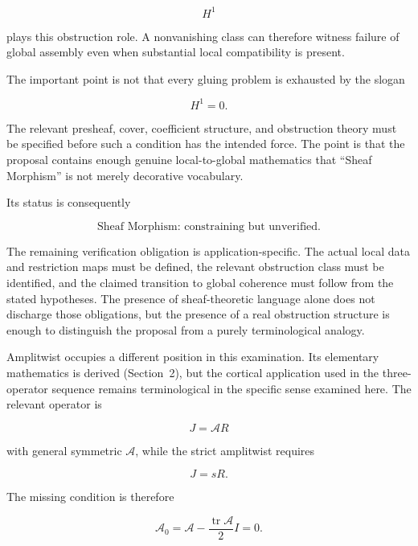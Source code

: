 \documentclass[11pt]{article}
\begin{document}
\begin{equation}
H^1
\end{equation}

plays this obstruction role. A nonvanishing class can therefore witness failure of global assembly even when substantial local compatibility is present.

The important point is not that every gluing problem is exhausted by the slogan

\begin{equation}
H^1=0.
\end{equation}

The relevant presheaf, cover, coefficient structure, and obstruction theory must be specified before such a condition has the intended force. The point is that the proposal contains enough genuine local-to-global mathematics that ``Sheaf Morphism'' is not merely decorative vocabulary.

Its status is consequently

\begin{equation}
\boxed{
\text{Sheaf Morphism: constraining but unverified}.
}
\end{equation}

The remaining verification obligation is application-specific. The actual local data and restriction maps must be defined, the relevant obstruction class must be identified, and the claimed transition to global coherence must follow from the stated hypotheses. The presence of sheaf-theoretic language alone does not discharge those obligations, but the presence of a real obstruction structure is enough to distinguish the proposal from a purely terminological analogy.

Amplitwist occupies a different position in this examination. Its elementary mathematics is derived (Section~2), but the cortical application used in the three-operator sequence remains terminological in the specific sense examined here. The relevant operator is

\begin{equation}
J=\mathcal A R
\end{equation}

with general symmetric $\mathcal A$, while the strict amplitwist requires

\begin{equation}
J=sR.
\end{equation}

The missing condition is therefore

\begin{equation}
\boxed{
\mathcal A_0
=
\mathcal A
-
\frac{\operatorname{tr}\mathcal A}{2}I
=
0.
}
\end{equation}
\end{document}
